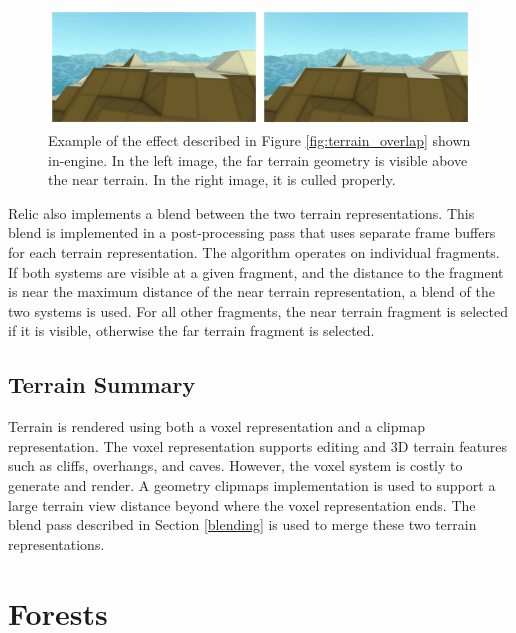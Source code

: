 \begin{figure}
	\centering
		\includegraphics[width=1.0\textwidth]{figures/terrain_protrusion}
	\caption{
		Example of the effect described in Figure \ref{fig:terrain_overlap} shown in-engine.
		In the left image, the far terrain geometry is visible above the near terrain.
		In the right image, it is culled properly.
	}
	\label{fig:terrain_protrusion}
\end{figure}

Relic also implements a blend between the two terrain representations.
This blend is implemented in a post-processing pass that uses separate frame buffers for each terrain representation.
The algorithm operates on individual fragments.
If both systems are visible at a given fragment, and the distance to the fragment is near the maximum distance of the near terrain representation, a blend of the two systems is used.
For all other fragments, the near terrain fragment is selected if it is visible, otherwise the far terrain fragment is selected.

\subsection{Terrain Summary}

Terrain is rendered using both a voxel representation and a clipmap representation.
The voxel representation supports editing and 3D terrain features such as cliffs, overhangs, and caves.
However, the voxel system is costly to generate and render.
A geometry clipmaps implementation is used to support a large terrain view distance beyond where the voxel representation ends.
The blend pass described in Section \ref{blending} is used to merge these two terrain representations.


\section{Forests} \label{forests} %

